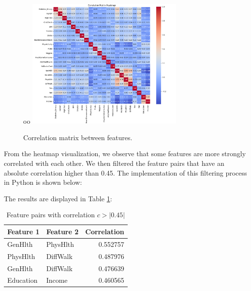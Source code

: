 

\begin{figure}[H]
    \centering
oo    \includegraphics[width=0.7\textwidth]{images/diabetes_correlation_matrix.png}
    \caption{Correlation matrix between features.}
    \label{fig:correlation-matrix}
\end{figure}

From the heatmap visualization, we observe that some features are more strongly correlated with each other. We then filtered the feature pairs that have an absolute correlation higher than 0.45. The implementation of this filtering process in Python is shown below:



The results are displayed in Table \ref{table:correlation-filtered}:

\begin{table}[ht]
\centering
\begin{tabular}{ |l|l|r| }
\hline
\rowcolor{gray!30}
\textbf{Feature 1} & \textbf{Feature 2} & \textbf{Correlation} \\
\hline
GenHlth    & PhysHlth   & 0.552757 \\
PhysHlth   & DiffWalk   & 0.487976 \\
GenHlth    & DiffWalk   & 0.476639 \\
Education  & Income     & 0.460565 \\
\hline
\end{tabular}
\caption{Feature pairs with correlation $c > |0.45|$}
\label{table:correlation-filtered}
\end{table}

